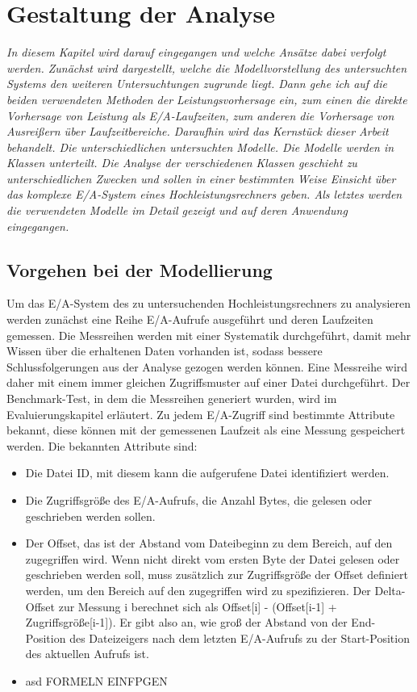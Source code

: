 \documentclass[
	12pt,
	a4paper,
	BCOR10mm,
	DIV14,
	listof=totoc,
	bibliography=totoc,
	headsepline
]{scrreprt}
\begin{document}
\chapter{Gestaltung der Analyse}
\textit{	
In diesem Kapitel wird darauf eingegangen und welche Ansätze dabei verfolgt werden.
Zunächst wird dargestellt, welche die Modellvorstellung des untersuchten Systems 	den weiteren Untersuchtungen zugrunde liegt.
Dann gehe ich auf die beiden verwendeten Methoden der Leistungsvorhersage ein, zum einen die direkte Vorhersage von Leistung als E/A-Laufzeiten, zum anderen die Vorhersage von Ausreißern über Laufzeitbereiche. 
Daraufhin wird das Kernstück dieser Arbeit behandelt. Die unterschiedlichen untersuchten Modelle. Die Modelle werden in Klassen unterteilt. Die Analyse der verschiedenen Klassen geschieht zu unterschiedlichen Zwecken und sollen in einer bestimmten Weise Einsicht über das komplexe E/A-System eines Hochleistungsrechners geben. Als letztes werden die verwendeten Modelle im Detail gezeigt und auf deren Anwendung eingegangen.
}
\bigskip

\section{Vorgehen bei der Modellierung}
Um das E/A-System des zu untersuchenden Hochleistungsrechners zu analysieren werden zunächst eine Reihe E/A-Aufrufe ausgeführt und deren Laufzeiten gemessen. Die Messreihen werden mit einer Systematik durchgeführt, damit mehr Wissen über die erhaltenen Daten vorhanden ist, sodass bessere Schlussfolgerungen aus der Analyse gezogen werden können.
Eine Messreihe wird daher mit einem immer gleichen Zugriffsmuster auf einer Datei durchgeführt.
Der Benchmark-Test, in dem die Messreihen generiert wurden, wird im Evaluierungskapitel erläutert.
Zu jedem E/A-Zugriff sind bestimmte Attribute bekannt, diese können mit der gemessenen Laufzeit als eine Messung gespeichert werden.
Die bekannten Attribute sind:
\begin{itemize}
	\item Die Datei ID, mit diesem kann die aufgerufene Datei identifiziert werden.
	\item Die Zugriffsgröße des E/A-Aufrufs, die Anzahl Bytes, die gelesen oder geschrieben werden sollen. 
	\item Der Offset, das ist der Abstand vom Dateibeginn zu dem Bereich, auf den zugegriffen wird. Wenn nicht direkt vom ersten Byte der Datei gelesen oder geschrieben werden soll, muss zusätzlich zur Zugriffsgröße der Offset definiert werden, um den Bereich auf den zugegriffen wird zu spezifizieren.
	Der Delta-Offset zur Messung i berechnet sich als Offset[i] - (Offset[i-1] + Zugriffsgröße[i-1]). Er gibt also an, wie groß der Abstand von der End-Position des Dateizeigers nach dem letzten E/A-Aufrufs zu der Start-Position des aktuellen Aufrufs ist.
	\item asd FORMELN EINFPGEN
\end{itemize}
\end{document}
